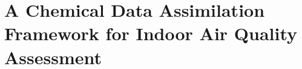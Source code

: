 \chapter{A Chemical Data Assimilation Framework for Indoor Air Quality Assessment}\label{ch:autochem}
